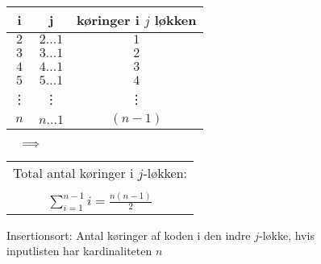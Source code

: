 \begin{figure}[b]
	\begin{center}
		\padtable
		\begin{tabular}{ c|c|c }
			i & j & køringer i $j$ løkken\\
			\hline
			$2$ & $2 \dots 1$ & $1$\\
			$3$ & $3 \dots 1$ & $2$\\
			$4$ & $4 \dots 1$ & $3$\\
			$5$ & $5 \dots 1$ & $4$\\
			\vdots & \vdots & \vdots\\
			$n$ & $n \dots 1$ & $(n-1)$\\
		\end{tabular}
		$\:\:\:\:\:\: \Longrightarrow \:\:\:\:\:\: $	
		\begin{tabular}{c}
			Total antal køringer i $j$-løkken:\\
			\vspace{-4mm}
			\\
			$\displaystyle\sum_{i=1}^{n-1}i=\frac{n(n-1)}{2}$
		\end{tabular}
	\end{center}
	\caption{Insertionsort: Antal køringer af koden i den indre $j$-løkke, hvis inputlisten har kardinaliteten $n$}
	\label{fig:Insertionsort Operationer i løkker}
\end{figure}

